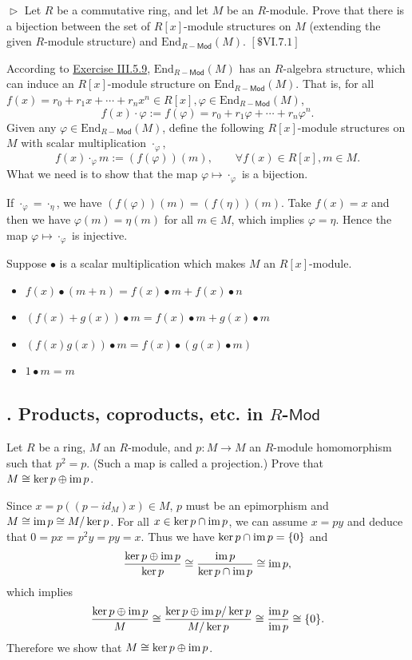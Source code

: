 \documentclass[12pt,letterpaper,boxed]{hmcpset}
\newcommand{\im}{\mathrm{im}\hspace{1.5pt}}
\newcommand{\Mod}{\mathsf{Mod}}
\begin{document}
\begin{problem}[5.11]
	$\vartriangleright$ Let $R$ be a commutative ring, and let $M$ be an $R$-module. Prove that there is a bijection between the set of $R[x]$-module structures on $M$ (extending the given $R$-module structure) and $\mathrm{End}_{R-\mathsf{Mod}}(M)$. $[\$ \mathrm{VI} .7 .1]$
\end{problem}
\begin{solution}	
	According to \hyperlink{Exercise III.5.9}{Exercise III.5.9}, $\mathrm{End}_{R-\mathsf{Mod}}(M)$ has an $R$-algebra structure, which can induce an $R[x]$-module structure on $\mathrm{End}_{R-\mathsf{Mod}}(M)$. That is, for all $f(x)=r_0+r_1x+\cdots+ r_nx^n\in R[x],\varphi\in \mathrm{End}_{R-\mathsf{Mod}}(M)$,
	\[
	f(x)\cdot \varphi:=f(\varphi)=r_0+r_1\varphi+\cdots+ r_n\varphi^n.
	\] 
	Given any $\varphi\in\mathrm{End}_{R-\mathsf{Mod}}(M)$, define the following $R[x]$-module structures on $M$ with scalar multiplication $\cdot_\varphi$,
	\[
	f(x)\cdot_\varphi m:=(f(\varphi))(m), \qquad\forall f(x)\in R[x],m\in M.
	\]
	What we need is to show that the map $\varphi\mapsto\cdot_\varphi$ is a bijection.
	

	If $\cdot_\varphi=\cdot_\eta$, we have $(f(\varphi))(m)=(f(\eta))(m)$. Take $f(x)=x$ and then we have $\varphi(m)=\eta(m)$ for all $m\in M$, which implies $\varphi=\eta$. Hence the map $\varphi\mapsto\cdot_\varphi$ is injective.
	
	Suppose $\bullet$ is a scalar multiplication which makes $M$ an $R[x]$-module.
	\begin{itemize}
		\item $f(x)\bullet (m+n)=f(x)\bullet m+f(x)\bullet n$
		\item $(f(x)+g(x))\bullet m=f(x)\bullet m+g(x)\bullet m$
		\item $(f(x) g(x))\bullet m=f(x)\bullet(g(x)\bullet m)$
		\item $1\bullet m=m$
	\end{itemize}
	
	
\end{solution}

\subsection{. Products, coproducts, etc. in $R$-$\Mod$}
\begin{problem}[6.3]
Let $R$ be a ring, $M$ an $R$-module, and $p : M \to M$ an $R$-module homomorphism such that $p^2 = p$. (Such a map is called a projection.) Prove that $M\cong\ker p \oplus\im p$.
\end{problem}
\begin{solution}
Since $x=p((p-id_M)x)\in M$, $p$ must be an epimorphism and $M\cong\im p\cong M/\ker p$. For all $x\in\ker p \cap \im p$, we can assume $x=py$ and deduce that $0=px=p^2y=py=x$. Thus we have $\ker p \cap \im p=\{0\}$ and
\[
\frac{\ker p \oplus\im p}{\ker p}\cong\frac{\im p}{\ker p \cap \im p}\cong\im p,
\]
which implies
\[
\frac{\ker p \oplus\im p}{M}\cong\frac{\ker p \oplus\im p/\ker p}{M/\ker p}\cong\frac{\im p}{ \im p}\cong\{0\}.
\]
Therefore we show that $M\cong\ker p \oplus\im p$.
\end{solution}
\end{document}
